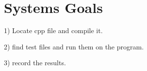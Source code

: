 \section{Systems Goals}
1) Locate cpp file and compile it.
 
 2) find test files and run them on the program.
 
 3) record the results.



